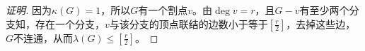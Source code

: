 \begin{proof}[证明]
  因为$\kappa(G)=1$，所以$G$有一个割点$v$。由$\deg v = r$，且$G-v$有至少两个分支知，存在一个分支，$v$与该分支的顶点联结的边数小于等于$[\frac{r}{2}]$，去掉这些边，$G$不连通，从而$\lambda(G) \leq [\frac{r}{2}]$。
\end{proof}
